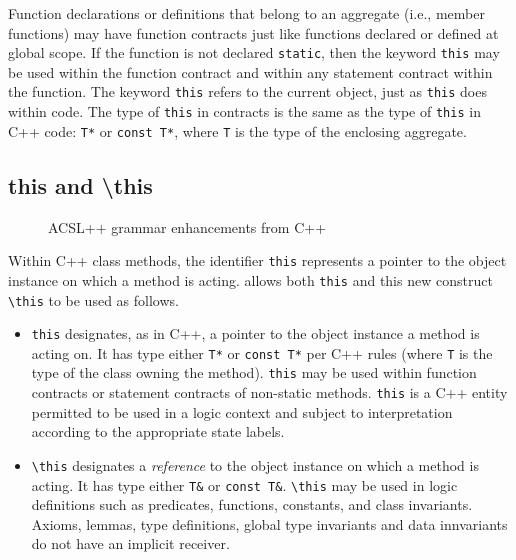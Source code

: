 Function declarations or definitions that belong to an aggregate (i.e., member functions) may have function
contracts just like functions declared or defined at global scope. If the function is not declared \lstinline|static|, then
the keyword \lstinline|this| may be used within the function
contract and within any statement contract within the 
function. The keyword \lstinline|this| refers to the current
object, just as \lstinline|this| does within \lang code.
The type of \lstinline|this| in contracts is the same as the type of \lstinline|this| in C++ code: \lstinline|T*| or \lstinline|const T*|, where \lstinline|T| is the type of the enclosing aggregate.


\subsection{\textbf{this} and \textbf{\textbackslash this}}


\begin{figure}
\begin{cadre}

\end{cadre}
\caption{ACSL++ grammar enhancements from C++}
\label{fig:gram:this}
\end{figure}

Within C++ class methods, the identifier \lstinline|this| represents a
pointer to the object instance on which a method is acting. \NAME
allows both \lstinline|this| and this new construct \lstinline|\this| 
to be used as follows.
\begin{itemize}
\item \lstinline|this| designates, as in C++, a pointer to the object
instance a method is acting on. It has type either \lstinline|T*|
or \lstinline|const T*| per C++ rules (where \lstinline|T| is the type
of the class owning the method). \lstinline|this| may be used
within function contracts or statement contracts of non-static methods.
\lstinline|this| is a C++ entity permitted to be used in a logic context
and subject to interpretation according to the appropriate state labels.

\item \lstinline|\this| designates a \textit{reference} to the object
instance on which a method is acting. It has type either \lstinline|T&| or
\lstinline|const T&|. 
\lstinline|\this| may be used in logic definitions
such as predicates, functions, constants, and class invariants. Axioms, lemmas, type definitions, global type invariants and data innvariants
do not have an implicit receiver.

\end{itemize}

